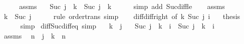 \begin{isabellebody}
%
\isadelimproof
%
\endisadelimproof
%
\isatagproof
{}\isamarkupfalse%
\ {\isacharminus}{\kern0pt}\isanewline
\ \ \isamarkupfalse%
\ assms\ \isamarkupfalse%
\ {\isacharasterisk}{\kern0pt}{\isacharcolon}{\kern0pt}\ {\isachardoublequoteopen}Suc\ {\isacharparenleft}{\kern0pt}j\ {\isacharminus}{\kern0pt}\ k{\isacharparenright}{\kern0pt}\ {\isacharequal}{\kern0pt}\ Suc\ j\ {\isacharminus}{\kern0pt}\ k{\isachardoublequoteclose}\isanewline
\ \ \ \ \isamarkupfalse%
\ {\isacharparenleft}{\kern0pt}simp\ add{\isacharcolon}{\kern0pt}\ Suc{\isacharunderscore}{\kern0pt}diff{\isacharunderscore}{\kern0pt}le{\isacharparenright}{\kern0pt}\isanewline
\ \ \isamarkupfalse%
\ assms\ \isamarkupfalse%
\ {\isachardoublequoteopen}k\ {\isasymle}\ Suc\ j{\isachardoublequoteclose}\isanewline
\ \ \ \ \isamarkupfalse%
\ {\isacharparenleft}{\kern0pt}rule\ order{\isacharunderscore}{\kern0pt}trans{\isacharparenright}{\kern0pt}\ simp\isanewline
\ \ \isamarkupfalse%
\ diff{\isacharunderscore}{\kern0pt}diff{\isacharunderscore}{\kern0pt}right\ {\isacharbrackleft}{\kern0pt}of\ k\ {\isachardoublequoteopen}Suc\ j{\isachardoublequoteclose}\ i{\isacharbrackright}{\kern0pt}\ {\isacharasterisk}{\kern0pt}\ \isamarkupfalse%
\ {\isacharquery}{\kern0pt}thesis\isanewline
\ \ \ \ \isamarkupfalse%
\ simp\isanewline
{}\isamarkupfalse%
%
\endisatagproof
{\isafoldproof}%
%
\isadelimproof
\isanewline
%
\endisadelimproof
\isanewline
{}\isamarkupfalse%
\ diff{\isacharunderscore}{\kern0pt}Suc{\isacharunderscore}{\kern0pt}diff{\isacharunderscore}{\kern0pt}eq{}\ {\isacharbrackleft}{\kern0pt}simp{\isacharbrackright}{\kern0pt}{\isacharcolon}{\kern0pt}\isanewline
\ \ \ {\isachardoublequoteopen}k\ {\isasymle}\ j{\isachardoublequoteclose}\isanewline
\ \ \ {\isachardoublequoteopen}Suc\ {\isacharparenleft}{\kern0pt}j\ {\isacharminus}{\kern0pt}\ k{\isacharparenright}{\kern0pt}\ {\isacharminus}{\kern0pt}\ i\ {\isacharequal}{\kern0pt}\ Suc\ j\ {\isacharminus}{\kern0pt}\ {\isacharparenleft}{\kern0pt}k\ {\isacharplus}{\kern0pt}\ i{\isacharparenright}{\kern0pt}{\isachardoublequoteclose}\isanewline
%
\isadelimproof
%
\endisadelimproof
%
\isatagproof
{}\isamarkupfalse%
\ {\isacharminus}{\kern0pt}\isanewline
\ \ \isamarkupfalse%
\ assms\ \isamarkupfalse%
\ n\ \ {\isachardoublequoteopen}j\ {\isacharequal}{\kern0pt}\ k\ {\isacharplus}{\kern0pt}\ n{\isachardoublequoteclose}\isanewline

\end{isabellebody}
